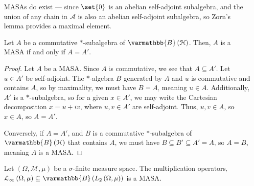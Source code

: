 \documentclass[10pt]{mypackage}
\renewcommand*{\mathbb}[1]{\varmathbb{#1}}
\newcommand{\B}{\mathbb{B}}
\begin{document}
\begin{remark}
  MASAs do exist --- since $\set{0}$  is an abelian self-adjoint subalgebra, and the union of any chain in $\mathcal{A}$ is also an abelian self-adjoint subalgebra, so Zorn's lemma provides a maximal element.
\end{remark}
\begin{proposition}
  Let $A$ be a commutative $\ast$-subalgebra of $\B\left(\mathcal{H}\right)$. Then, $A$ is a MASA if and only if $A = A'$.
\end{proposition}
\begin{proof}
  Let $A$ be a MASA. Since $A$ is commutative, we see that $A\subseteq A'$. Let $u\in A'$ be self-adjoint. The $\ast$-algebra $B$ generated by $A$ and $u$ is commutative and contains $A$, so by maximality, we must have $B = A$, meaning $u\in A$. Additionally, $A'$ is a $\ast$-subalgebra, so for a given $x\in A'$, we may write the Cartesian decomposition $x = u + iv$, where $u,v\in A'$ are self-adjoint. Thus, $u,v\in A$, so $x\in A$, so $A = A'$.\newline

  Conversely, if $A = A'$, and $B$ is a commutative $\ast$-subalgebra of $\B\left(\mathcal{H}\right)$ that contains $A$, we must have $B\subseteq B' \subseteq A' = A$, so $A = B$, meaning $A$ is a MASA.
\end{proof}
\begin{proposition}
  Let $\left(\Omega,\mathcal{M},\mu\right)$ be a $\sigma$-finite measure space. The multiplication operators, $\mathcal{L}_{\infty}\left(\Omega,\mu\right)\subseteq \B\left(L_{2}\left(\Omega,\mu\right)\right)$ is a MASA.
\end{proposition}
\end{document}

